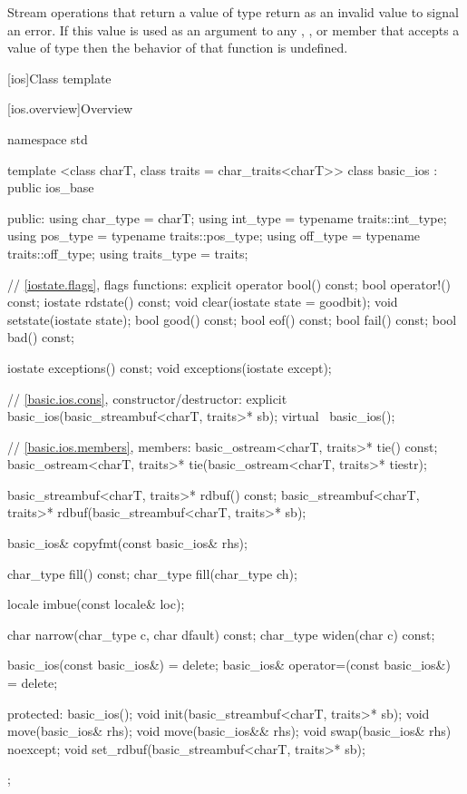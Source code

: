 \pnum
Stream operations that return a value of type
return
as an invalid value to signal an error.
If this value is used as an argument to any
,
,
or
 member
that accepts a value of type
then the behavior of that function is undefined.
%

[ios]{Class template }

[ios.overview]{Overview}

%
\begin{codeblock}
namespace std {
  template <class charT, class traits = char_traits<charT>>
  class basic_ios : public ios_base {
  public:
    using char_type   = charT;
    using int_type    = typename traits::int_type;
    using pos_type    = typename traits::pos_type;
    using off_type    = typename traits::off_type;
    using traits_type = traits;

    // \ref{iostate.flags}, flags functions:
    explicit operator bool() const;
    bool operator!() const;
    iostate rdstate() const;
    void clear(iostate state = goodbit);
    void setstate(iostate state);
    bool good() const;
    bool eof()  const;
    bool fail() const;
    bool bad()  const;

    iostate exceptions() const;
    void exceptions(iostate except);

    // \ref{basic.ios.cons}, constructor/destructor:
    explicit basic_ios(basic_streambuf<charT, traits>* sb);
    virtual ~basic_ios();

    // \ref{basic.ios.members}, members:
    basic_ostream<charT, traits>* tie() const;
    basic_ostream<charT, traits>* tie(basic_ostream<charT, traits>* tiestr);

    basic_streambuf<charT, traits>* rdbuf() const;
    basic_streambuf<charT, traits>* rdbuf(basic_streambuf<charT, traits>* sb);

    basic_ios& copyfmt(const basic_ios& rhs);

    char_type fill() const;
    char_type fill(char_type ch);

    locale imbue(const locale& loc);

    char      narrow(char_type c, char dfault) const;
    char_type widen(char c) const;

    basic_ios(const basic_ios&) = delete;
    basic_ios& operator=(const basic_ios&) = delete;

  protected:
    basic_ios();
    void init(basic_streambuf<charT, traits>* sb);
    void move(basic_ios& rhs);
    void move(basic_ios&& rhs);
    void swap(basic_ios& rhs) noexcept;
    void set_rdbuf(basic_streambuf<charT, traits>* sb);

  };
}
\end{codeblock}

